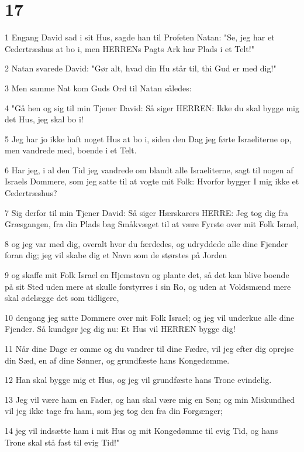 \chapter{17}

\par 1 Engang David sad i sit Hus, sagde han til Profeten Natan: "Se, jeg har et Cedertræshus at bo i, men HERRENs Pagts Ark har Plads i et Telt!"
\par 2 Natan svarede David: "Gør alt, hvad din Hu står til, thi Gud er med dig!"
\par 3 Men samme Nat kom Guds Ord til Natan således:
\par 4 "Gå hen og sig til min Tjener David: Så siger HERREN: Ikke du skal bygge mig det Hus, jeg skal bo i!
\par 5 Jeg har jo ikke haft noget Hus at bo i, siden den Dag jeg førte Israeliterne op, men vandrede med, boende i et Telt.
\par 6 Har jeg, i al den Tid jeg vandrede om blandt alle Israeliterne, sagt til nogen af Israels Dommere, som jeg satte til at vogte mit Folk: Hvorfor bygger I mig ikke et Cedertræshus?
\par 7 Sig derfor til min Tjener David: Så siger Hærskarers HERRE: Jeg tog dig fra Græsgangen, fra din Plads bag Småkvæget til at være Fyrste over mit Folk Israel,
\par 8 og jeg var med dig, overalt hvor du færdedes, og udryddede alle dine Fjender foran dig; jeg vil skabe dig et Navn som de størstes på Jorden
\par 9 og skaffe mit Folk Israel en Hjemstavn og plante det, så det kan blive boende på sit Sted uden mere at skulle forstyrres i sin Ro, og uden at Voldsmænd mere skal ødelægge det som tidligere,
\par 10 dengang jeg satte Dommere over mit Folk Israel; og jeg vil underkue alle dine Fjender. Så kundgør jeg dig nu: Et Hus vil HERREN bygge dig!
\par 11 Når dine Dage er omme og du vandrer til dine Fædre, vil jeg efter dig oprejse din Sæd, en af dine Sønner, og grundfæste hans Kongedømme.
\par 12 Han skal bygge mig et Hus, og jeg vil grundfæste hans Trone evindelig.
\par 13 Jeg vil være ham en Fader, og han skal være mig en Søn; og min Miskundhed vil jeg ikke tage fra ham, som jeg tog den fra din Forgænger;
\par 14 jeg vil indsætte ham i mit Hus og mit Kongedømme til evig Tid, og hans Trone skal stå fast til evig Tid!"
